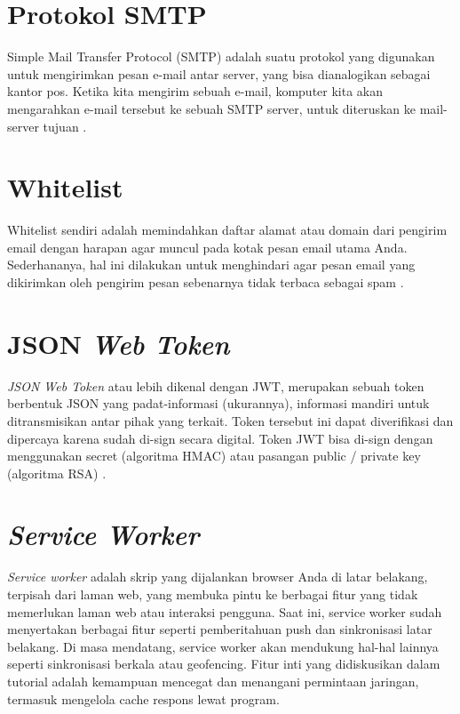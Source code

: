    \section{Protokol SMTP}
   Simple Mail Transfer Protocol (SMTP) adalah suatu protokol yang digunakan untuk mengirimkan pesan e-mail antar server, yang bisa dianalogikan sebagai kantor pos. Ketika kita mengirim sebuah e-mail, komputer kita akan mengarahkan e-mail tersebut ke sebuah SMTP server, untuk diteruskan ke mail-server tujuan \cite{noauthor_smtp_nodate}. 
   
   \section{Whitelist}
   Whitelist sendiri adalah memindahkan daftar alamat atau domain dari pengirim email dengan harapan agar muncul pada kotak pesan email utama Anda. Sederhananya, hal ini dilakukan untuk menghindari agar pesan email yang dikirimkan oleh pengirim pesan sebenarnya tidak terbaca sebagai spam \cite{wikipedia_sendgrid_2017}.
   
   \section{JSON \textit{Web Token}}
   \textit{JSON Web Token }atau lebih dikenal dengan JWT, merupakan sebuah token berbentuk JSON yang padat-informasi (ukurannya), informasi mandiri untuk ditransmisikan antar pihak yang terkait. Token tersebut ini dapat diverifikasi dan dipercaya karena sudah di-sign secara digital. Token JWT bisa di-sign dengan menggunakan secret (algoritma HMAC) atau pasangan public / private key (algoritma RSA) \cite{noauthor_jwt_2016}.
   
   \section{\textit{Service Worker}}
   \textit{Service worker }adalah skrip yang dijalankan browser Anda di latar belakang, terpisah dari laman web, yang membuka pintu ke berbagai fitur yang tidak memerlukan laman web atau interaksi pengguna. Saat ini, service worker sudah menyertakan berbagai fitur seperti pemberitahuan push dan sinkronisasi latar belakang. Di masa mendatang, service worker akan mendukung hal-hal lainnya seperti sinkronisasi berkala atau geofencing. Fitur inti yang didiskusikan dalam tutorial adalah kemampuan mencegat dan menangani permintaan jaringan, termasuk mengelola cache respons lewat program\cite{google_developers_service_2017}.
   
